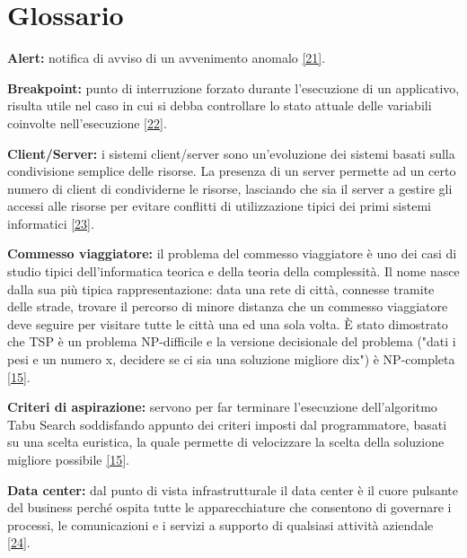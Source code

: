 \chapter{Glossario}

\begin{description}
    \item \label{Alert} \textbf{Alert:} notifica di avviso di un avvenimento anomalo \hyperref[alert]{[21]}.
    \item \label{Breakpoint} \textbf{Breakpoint:} punto di interruzione forzato durante l'esecuzione di un applicativo, risulta utile nel caso in cui si debba controllare lo stato attuale delle
     variabili coinvolte nell'esecuzione \hyperref[breakpoint]{[22]}.
    \item \label{Client/Server} \textbf{Client/Server:} i sistemi client/server sono un'evoluzione dei sistemi basati sulla condivisione semplice delle risorse. La presenza di un server permette ad un
     certo numero di client di condividerne le risorse, lasciando che sia il server a gestire gli accessi alle risorse per evitare conflitti di utilizzazione tipici dei primi 
     sistemi informatici \hyperref[client/server]{[23]}.
    \item \label{Commesso viaggiatore} \textbf{Commesso viaggiatore:} il problema del commesso viaggiatore è uno
    dei casi di studio tipici dell’informatica teorica e della teoria della complessità. Il
    nome nasce dalla sua più tipica rappresentazione: data una rete di città, connesse
    tramite delle strade, trovare il percorso di minore distanza che un commesso
    viaggiatore deve seguire per visitare tutte le città una ed una sola volta. È
    stato dimostrato che TSP è un problema NP-difficile e la versione decisionale del
    problema ("dati i pesi e un numero x, decidere se ci sia una soluzione migliore dix") è NP-completa \hyperref[slide]{[15]}.
    
    \item \label{Criteri di aspirazione} \textbf{Criteri di aspirazione:} servono per far terminare l'esecuzione dell'algoritmo Tabu Search soddisfando appunto dei criteri imposti dal programmatore, basati su una scelta
    euristica, la quale permette di velocizzare la scelta della soluzione migliore possibile \hyperref[slide]{[15]}.
    
    \item \label{Data center} \textbf{Data center:} dal punto di vista infrastrutturale il data center è il cuore pulsante del business perché ospita tutte le apparecchiature che consentono di governare i processi,
    le comunicazioni e i servizi a supporto di qualsiasi attività aziendale \hyperref[datacenter]{[24]}.
    

\end{description}
